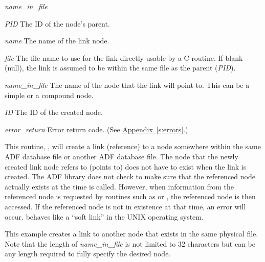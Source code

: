 \begin{Ventryi}{\textit{name\_in\_file}}
\item[\textit{PID}]
     The ID of the node's parent.
\item[\textit{name}]
     The name of the link node.
\item[\textit{file}]
     The file name to use for the link directly usable by a C
      routine.
     If blank (null), the link is assumed to be within the same file
     as the parent (\textit{PID}).
\item[\textit{name\_in\_file}]
     The name of the node that the link will point to.
     This can be a simple or a compound node.
\item[\textit{ID}]
     The ID of the created node.
\item[\textit{error\_return}]
     Error return code.
     (See \hyperref[s:errors]{Appendix~\ref*{s:errors}}.)
\end{Ventryi}

This routine, , will create a link (reference) to a
node somewhere within the same ADF database file or another ADF database
file.
The node that the newly created link node refers to (points to) does not
have to exist when the link is created.
The ADF library does not check to make sure that the referenced node
actually exists at the time  is called.
However, when information from the referenced node is requested by
routines such as \hyperlink{sub:Get\_Label}{}
or \hyperlink{sub:Read\_Data}{}, the
referenced node is then accessed.
If the referenced node is not in existence at that time, an error will
occur.
 behaves like a ``soft link'' in the UNIX operating system.


This example creates a link to another node that exists in the same
physical file.
Note that the length of \textit{name\_in\_file} is not limited to 32
characters but can be any length required to fully specify the desired
node.

